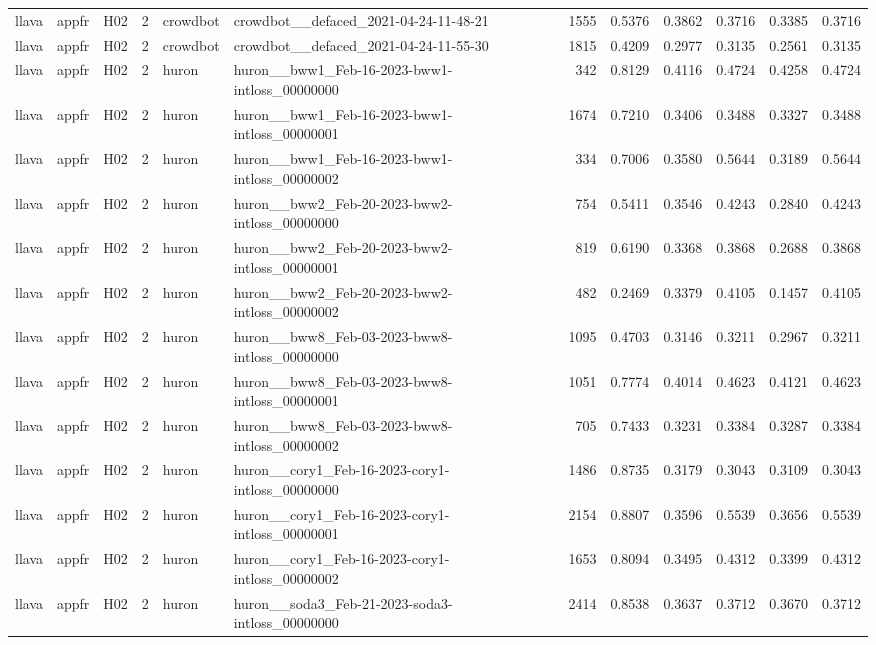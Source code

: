 \begin{table}[tbp]
\begin{tabular}{lllrllrrrrrr}
llava & appfr & H02 & 2 & crowdbot & crowdbot\_\_defaced\_2021-04-24-11-48-21 & 1555 & 0.5376 & 0.3862 & 0.3716 & 0.3385 & 0.3716 \\
llava & appfr & H02 & 2 & crowdbot & crowdbot\_\_defaced\_2021-04-24-11-55-30 & 1815 & 0.4209 & 0.2977 & 0.3135 & 0.2561 & 0.3135 \\
llava & appfr & H02 & 2 & huron & huron\_\_bww1\_Feb-16-2023-bww1-intloss\_00000000 & 342 & 0.8129 & 0.4116 & 0.4724 & 0.4258 & 0.4724 \\
llava & appfr & H02 & 2 & huron & huron\_\_bww1\_Feb-16-2023-bww1-intloss\_00000001 & 1674 & 0.7210 & 0.3406 & 0.3488 & 0.3327 & 0.3488 \\
llava & appfr & H02 & 2 & huron & huron\_\_bww1\_Feb-16-2023-bww1-intloss\_00000002 & 334 & 0.7006 & 0.3580 & 0.5644 & 0.3189 & 0.5644 \\
llava & appfr & H02 & 2 & huron & huron\_\_bww2\_Feb-20-2023-bww2-intloss\_00000000 & 754 & 0.5411 & 0.3546 & 0.4243 & 0.2840 & 0.4243 \\
llava & appfr & H02 & 2 & huron & huron\_\_bww2\_Feb-20-2023-bww2-intloss\_00000001 & 819 & 0.6190 & 0.3368 & 0.3868 & 0.2688 & 0.3868 \\
llava & appfr & H02 & 2 & huron & huron\_\_bww2\_Feb-20-2023-bww2-intloss\_00000002 & 482 & 0.2469 & 0.3379 & 0.4105 & 0.1457 & 0.4105 \\
llava & appfr & H02 & 2 & huron & huron\_\_bww8\_Feb-03-2023-bww8-intloss\_00000000 & 1095 & 0.4703 & 0.3146 & 0.3211 & 0.2967 & 0.3211 \\
llava & appfr & H02 & 2 & huron & huron\_\_bww8\_Feb-03-2023-bww8-intloss\_00000001 & 1051 & 0.7774 & 0.4014 & 0.4623 & 0.4121 & 0.4623 \\
llava & appfr & H02 & 2 & huron & huron\_\_bww8\_Feb-03-2023-bww8-intloss\_00000002 & 705 & 0.7433 & 0.3231 & 0.3384 & 0.3287 & 0.3384 \\
llava & appfr & H02 & 2 & huron & huron\_\_cory1\_Feb-16-2023-cory1-intloss\_00000000 & 1486 & 0.8735 & 0.3179 & 0.3043 & 0.3109 & 0.3043 \\
llava & appfr & H02 & 2 & huron & huron\_\_cory1\_Feb-16-2023-cory1-intloss\_00000001 & 2154 & 0.8807 & 0.3596 & 0.5539 & 0.3656 & 0.5539 \\
llava & appfr & H02 & 2 & huron & huron\_\_cory1\_Feb-16-2023-cory1-intloss\_00000002 & 1653 & 0.8094 & 0.3495 & 0.4312 & 0.3399 & 0.4312 \\
llava & appfr & H02 & 2 & huron & huron\_\_soda3\_Feb-21-2023-soda3-intloss\_00000000 & 2414 & 0.8538 & 0.3637 & 0.3712 & 0.3670 & 0.3712 \\

\end{tabular}
\end{table}
